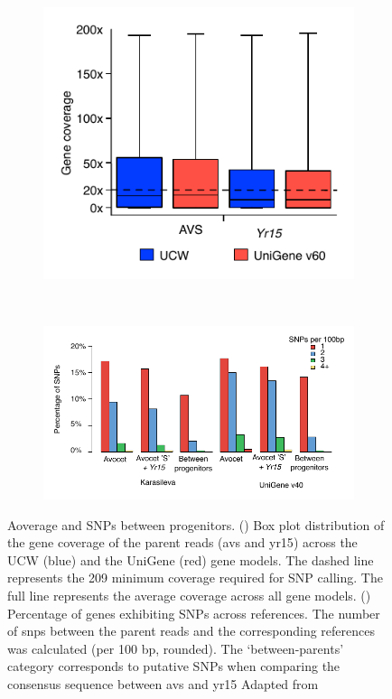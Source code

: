 \begin{figure}
\centering
\begin{subfigure}{0.38\textwidth}
    \caption{}
     \includegraphics[width=1\textwidth]{Yr15/Figures/CoveragePerGene.pdf} 
    \label{fig:yr15:covPerGene}
\end{subfigure}
~
\begin{subfigure}{0.58\textwidth}
    \caption{}
    \includegraphics[width=1\textwidth]{Yr15/Figures/PercentageOfSnps.pdf} 
    
    \label{fig:yr15:SNPper}
\end{subfigure}
\caption[Coverage and SNPs between progenitors]{Aoverage and SNPs between progenitors. () Box plot distribution of the gene coverage of the parent reads (\gls{avs} and \gls{yr15}) across the UCW (blue) and the UniGene (red) gene models. The dashed line represents the 209 minimum coverage required for SNP calling. The full line represents the average coverage across all gene models. () Percentage of genes exhibiting SNPs across references. The number of \gls{snp}s between the parent reads and the corresponding references was calculated (per 100 bp, rounded). The ‘between-parents’ category corresponds to putative SNPs when comparing the consensus sequence between \gls{avs} and \gls{yr15} Adapted from \citet{Ramirez-Gonzalez2015b} }
\end{figure}



